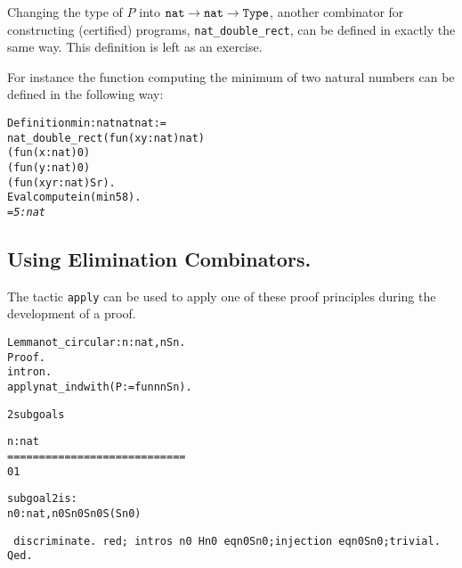 \documentclass[11pt]{article}
\newtheorem{exercise}{Exercise}[section]
\begin{document}
Changing the type of $P$ into $\texttt{nat}\rightarrow\texttt{nat}\rightarrow\texttt{Type}$,
another combinator for constructing 
(certified) programs, \texttt{nat\_double\_rect}, can be defined in exactly the same way.
This definition is left as an exercise.\label{natdoublerect}

\iffalse
\begin{alltt}
Section Principle_of_Double_Recursion.
Variable    P               : nat {\arrow} nat {\arrow} Type.
Hypothesis  base_case1      : {\prodsym} x:nat, P 0 x.
Hypothesis  base_case2      : {\prodsym} x:nat, P (S x) 0.
Hypothesis  inductive_step   : {\prodsym} n m:nat, P n m {\arrow} P (S n) (S m).
Fixpoint nat_double_rect (n m:nat)\{struct n\} : P n m := 
  match n, m return P n m with 
            0 ,     x   {\funarrow}  base_case1 x 
         |  (S x),    0   {\funarrow} base_case2 x
         |  (S x), (S y) {\funarrow} inductive_step x y (nat_double_rect x y)
     end.
End Principle_of_Double_Recursion.
\end{alltt}
\fi
For instance the function computing the minimum of two natural
numbers can be defined in the following way:

\begin{alltt}
Definition min : nat {\arrow} nat {\arrow} nat  := 
  nat_double_rect (fun (x y:nat) {\funarrow} nat)
                 (fun (x:nat) {\funarrow} 0)
                 (fun (y:nat) {\funarrow} 0)
                 (fun (x y r:nat) {\funarrow} S r).
Eval compute in (min 5 8).
\it
= 5 : nat
\end{alltt}


%

\subsection{Using Elimination Combinators.} 
The tactic \texttt{apply} can be used to apply one of these proof
principles during the development of a proof. 

\begin{alltt}
Lemma not_circular : {\prodsym} n:nat, n {\coqdiff} S n.
Proof.
 intro n.
 apply nat_ind with (P:= fun n {\funarrow} n {\coqdiff} S n).
\it



2 subgoals
  
  n : nat
  ============================
   0 {\coqdiff} 1


subgoal 2 is:
 {\prodsym} n0 : nat, n0 {\coqdiff} S n0 {\arrow} S n0 {\coqdiff} S (S n0)

\tt
 discriminate.
 red; intros n0 Hn0 eqn0Sn0;injection eqn0Sn0;trivial.
Qed.
\end{alltt}
\end{document}
